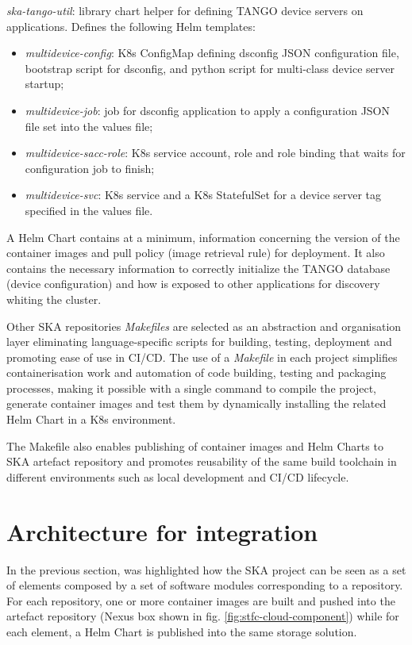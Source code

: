 \documentclass[a4paper,
	       keeplastbox,   %
	       References
	       ]{jacow}
\begin{document}
\textit{ska-tango-util}: library chart helper for defining TANGO device servers on applications. Defines the following Helm templates:

\begin{itemize}
	\setlength\itemsep{0.1em}
    \item \textit{multidevice-config}: K8s ConfigMap defining dsconfig JSON configuration file, bootstrap script for  dsconfig, and python script for multi-class device server startup;
	\item \textit{multidevice-job}: job for dsconfig application to apply a configuration JSON file set into the values file;
    \item \textit{multidevice-sacc-role}: K8s service account, role and role binding that waits for configuration job to finish;
    \item \textit{multidevice-svc}: K8s service and a K8s StatefulSet for a device server tag specified in the values file.
\end{itemize}

A Helm Chart contains at a minimum, information concerning the version of the container images and pull policy (image retrieval rule) for deployment. It also contains the necessary information to correctly initialize the TANGO database (device configuration) and how is exposed to other applications for discovery whiting the cluster.

Other SKA repositories \textit{Makefiles} are selected as an abstraction and organisation layer eliminating language-specific scripts for building, testing, deployment and promoting ease of use in CI/CD. The use of a \textit{Makefile} in each project simplifies containerisation work and automation of code building, testing and packaging processes, making it possible with a single command to compile the project, generate container images and test them by dynamically installing the related Helm Chart in a K8s environment.

The Makefile also enables publishing of container images and Helm Charts to SKA artefact repository and promotes reusability of the same build toolchain in different environments such as local development and CI/CD lifecycle.

\section{Architecture for integration}

In the previous section, was highlighted how the SKA project can be seen as a set of elements composed by a set of software modules corresponding to a repository. For each repository, one or more container images are built and pushed into the artefact repository (Nexus\cite{nexus} box shown in fig. \ref{fig:stfc-cloud-component}) while for each element, a Helm Chart is published into the same storage solution. 
\end{document}
